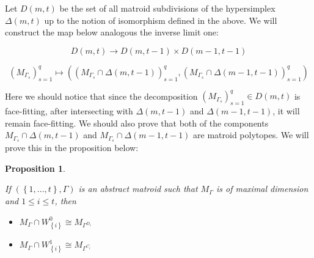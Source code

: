 \documentclass[12pt, reqno]{amsart}
\newtheorem{proposition}[theorem]{Proposition}
\theoremstyle{definition}
\theoremstyle{remark}
\numberwithin{equation}{section}
\newtheorem{notation}{Notation}[section]
\begin{document}
  Let $D(m,t)$ be the set of all matroid subdivisions of the hypersimplex $\Delta(m,t)$ up to the notion of isomorphism defined in the above. We will construct the map  below 
  analogous the inverse limit one:
  
  
  \begin{center}
  	\[
  D(m, t)  \longrightarrow  D(m, t-1)\times D(m-1, t-1)
  	\]
  	
  	\[
  	(M_{\Gamma_s})^q_{s=1}
  	\longmapsto
  (	(M_{\Gamma_s}\cap \Delta(m,t-1))^q_{s=1}, 	(M_{\Gamma_s}\cap \Delta(m-1,t-1))^q_{s=1})
  	\]
  \end{center}
  
  
  Here we should notice that since the decomposition 
  	$(M_{\Gamma_s})^q_{s=1}\in D(m,t)$
  is face-fitting, after intersecting with
  $\Delta(m,t-1)$ and $\Delta(m-1,t-1)$, it will remain face-fitting.
  We should also prove that both of the components 
  $M_{\Gamma_s}\cap \Delta(m,t-1)$ and $M_{\Gamma_s}\cap \Delta(m-1,t-1)$ are matroid polytopes. We will prove this in the proposition below:
  
  
  
  
 
  
  
  
  
  \begin{proposition}\label{intersection}
  	
  	If 
  	$(\left\{1,...,t\right\},\varGamma)$
  	 is an abstract matroid  such that $M_{\Gamma}$ is of maximal dimension and $1\leq i\leq t$,
  	then
  	
  	\begin{itemize}
  		\item 
  		$M_{\Gamma}\cap W^0_{\left\{i\right\}}\cong M_{\Gamma^{D_i}}$
  		\item 
  		$M_{\Gamma}\cap W^1_{\left\{i\right\}}\cong M_{\Gamma^{C_i}}$
  		
  	\end{itemize}
  	
  \end{proposition}
\end{document}
